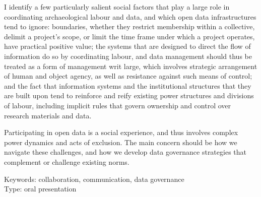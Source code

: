 \documentclass[a4paper]{article}
\begin{document}
I identify a few particularly salient social factors that play a large role in coordinating archaeological labour and data, and which open data infrastructures tend to ignore: boundaries, whether they restrict membership within a collective, delimit a project's scope, or limit the time frame under which a project operates, have practical positive value; the systems that are designed to direct the flow of information do so by coordinating labour, and data management should thus be treated as a form of management writ large, which involves strategic arrangement of human and object agency, as well as resistance against such means of control; and the fact that information systems and the institutional structures that they are built upon tend to reinforce and reify existing power structures and divisions of labour, including implicit rules that govern ownership and control over research materials and data.

Participating in open data is a social experience, and thus involves complex power dynamics and acts of exclusion. The main concern should be how we navigate these challenges, and how we develop data governance strategies that complement or challenge existing norms.




\hspace{10pt}

\normalsize
\noindent
Keywords: collaboration, communication, data governance\\
Type: oral presentation

\printbibliography
\end{document}
